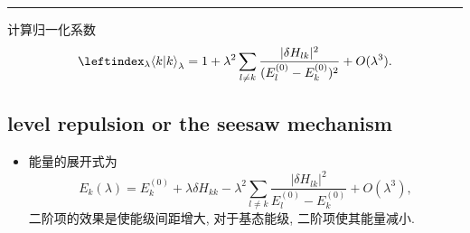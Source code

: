 \begin{itemize}
\begin{tcolorbox}[title=calculation:]
		\noindent\rule[0.5ex]{\linewidth}{0.5pt} %
		
		计算归一化系数
		\begin{equation}
			\leftindex_\lambda {\braket{k | k}}_\lambda = 1 + \lambda^2 \sum_{l \neq k} \frac{|\delta H_{l k}|^2}{(E_l^{(0)} - E_k^{(0)})^2} + O(\lambda^3).
		\end{equation}
	\end{tcolorbox}
\end{itemize}

\subsection{level repulsion or the seesaw mechanism} \label{subsection perturbation theory in QM.1.1}
\begin{itemize}
	\item 能量的展开式为
	\begin{equation}
		E_k(\lambda) = E_k^{(0)} + \lambda \delta H_{k k} - \lambda^2 \sum_{l \neq k} \frac{|\delta H_{l k}|^2}{E_l^{(0)} - E_k^{(0)}} + O(\lambda^3),
	\end{equation}
	二阶项的效果是使能级间距增大, 对于基态能级, 二阶项使其能量减小.
\end{itemize}


